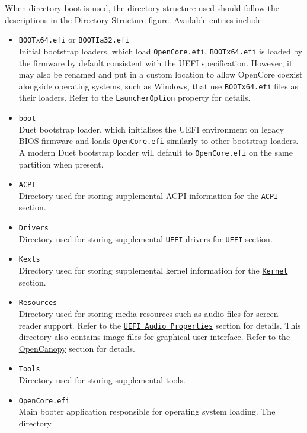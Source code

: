 \documentclass[]{article}
\providecommand{\tightlist}{%
  \setlength{\itemsep}{0pt}\setlength{\parskip}{0pt}}
\begin{document}
When directory boot is used, the directory structure used should follow
the descriptions in the \hyperref[fig:DS]{Directory Structure} figure.
Available entries include:

\begin{itemize}
\tightlist
\item
  \texttt{BOOTx64.efi} or \texttt{BOOTIa32.efi} \\
  Initial bootstrap loaders, which load \texttt{OpenCore.efi}. \texttt{BOOTx64.efi}
  is loaded by the firmware by default consistent with the UEFI specification. However,
  it may also be renamed and put in a custom location to allow OpenCore coexist alongside
  operating systems, such as Windows, that use \texttt{BOOTx64.efi} files as their loaders.
  Refer to the \texttt{LauncherOption} property for details.
\item
  \texttt{boot} \\
  Duet bootstrap loader, which initialises the UEFI environment on legacy BIOS firmware
  and loads \texttt{OpenCore.efi} similarly to other bootstrap loaders. A modern Duet
  bootstrap loader will default to \texttt{OpenCore.efi} on the same partition when
  present.
\item
  \texttt{ACPI} \\
  Directory used for storing supplemental ACPI information
  for the \hyperref[acpi]{\texttt{ACPI}} section.
\item
  \texttt{Drivers} \\
  Directory used for storing supplemental \texttt{UEFI}
  drivers for \hyperref[uefi]{\texttt{UEFI}} section.
\item
  \texttt{Kexts} \\
  Directory used for storing supplemental kernel information
  for the \hyperref[kernel]{\texttt{Kernel}} section.
\item
  \texttt{Resources} \\
  Directory used for storing media resources such as audio files
  for screen reader support. Refer to the \hyperref[uefiaudioprops]{\texttt{UEFI Audio Properties}}
  section for details. This directory also contains image files
  for graphical user interface. Refer to the \hyperref[ueficanopy]{OpenCanopy} section for details.
\item
  \texttt{Tools} \\
  Directory used for storing supplemental tools.
\item
  \texttt{OpenCore.efi} \\
  Main booter application responsible for operating system loading. The directory

\end{itemize}
\end{document}
